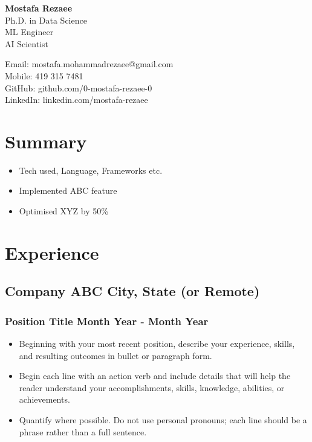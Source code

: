 \documentclass[11pt]{article} %
\begin{document}
\begin{center}
	\begin{minipage}{0.45\textwidth}
		{\Huge\bfseries
			Mostafa Rezaee  %
		} \\ \medskip
		Ph.D. in Data Science \\ %
		ML Engineer \\
		AI Scientist
	\end{minipage} \hfill
	\begin{minipage}{0.48\textwidth}
		Email: mostafa.mohammadrezaee@gmail.com \\
		Mobile: 419 315 7481 \\
		GitHub: github.com/0-mostafa-rezaee-0 \\
		LinkedIn: linkedin.com/mostafa-rezaee 
	\end{minipage}
\end{center}

\section{Summary}
\begin{itemize}
	\item Tech used, Language, Frameworks etc.
	\item Implemented ABC feature
	\item Optimised XYZ by 50\%
\end{itemize}

\section{Experience}
\subsection{Company ABC \hfill City, State (or Remote)}
\subsubsection{Position Title \hfill  Month Year - Month Year}
\begin{itemize}
	\item Beginning with your most recent position, describe your experience, skills, and resulting outcomes in bullet or paragraph form.
	\item Begin each line with an action verb and include details that will help the reader understand your accomplishments, skills, knowledge, abilities, or achievements.
	\item Quantify where possible. Do not use personal pronouns; each line should be a phrase rather than a full sentence.
\end{itemize}
\end{document}
